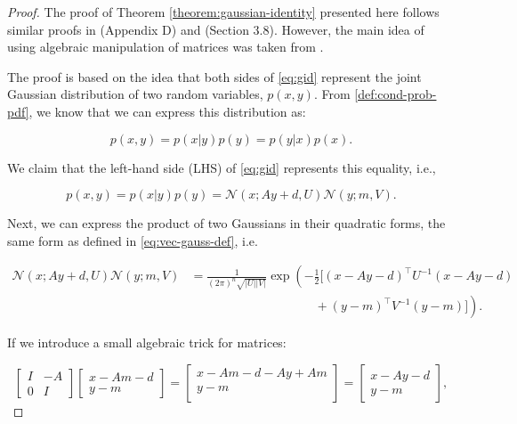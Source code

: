 \begin{proof}\label{proof:gaussian-identity}
    The proof of Theorem \ref{theorem:gaussian-identity} presented here follows similar proofs in \cite{mahlerStatisticalMultisourcemultitargetInformation2007} (Appendix D) and \cite{risticKalmanFilterParticle2004} (Section 3.8). However, the main idea of using algebraic manipulation of matrices was taken from \cite{tokleMultiTargetTracking2018}.
    
    The proof is based on the idea that both sides of \ref{eq:gid} represent the joint Gaussian distribution of two random variables, $p(x,y)$. From \ref{def:cond-prob-pdf}, we know that we can express this distribution as:
    
    \begin{equation}
        p(x, y) = p(x|y)p(y) = p(y|x)p(x).
    \end{equation}
    
    We claim that the left-hand side (LHS) of \ref{eq:gid} represents this equality, i.e.,
    
    \begin{equation}
        p(x, y) = p(x|y)p(y) = \mathscr{N}(x ; A y + d, U) \mathscr{N}(y ; m, V).
    \end{equation}

    Next, we can express the product of two Gaussians in their quadratic forms, the same form as defined in \ref{eq:vec-gauss-def}, i.e.

    \begin{align}
        \mathscr{N}(x ; A y + d, U) \mathscr{N}(y ; m, V)
        &= \frac{1}{(2\pi)^{n} \sqrt{|U| |V|}}
        \exp \left(
        -\frac{1}{2}
        \bigg[(x - Ay - d)^\intercal U^{-1} (x - Ay - d) \right.\\
        &\left.\qquad\qquad\qquad\qquad\qquad+ (y - m)^\intercal V^{-1} (y - m) \bigg] \right).
        \label{eq:gid-proof:lhs-expanded}
    \end{align}

    If we introduce a small algebraic trick for matrices:

    \begin{equation*}
        \begin{bmatrix}
            I & -A \\
            0 & I
        \end{bmatrix}
        \begin{bmatrix}
            x - Am - d \\
            y - m
        \end{bmatrix}
        =
        \begin{bmatrix}
            x - Am - d - Ay + Am \\
            y - m \\
        \end{bmatrix}
        =
        \begin{bmatrix}
            x - Ay - d \\
            y - m
        \end{bmatrix},
    \end{equation*}
    

\end{proof}
